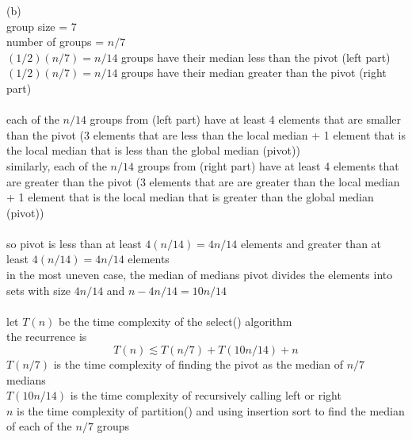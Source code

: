 \documentclass[12pt,border=4pt,multi]{article}%
\begin{document}
\\
\\
\\
\\
\\
(b)\\
group size = 7\\
number of groups = $n/7$\\
$(1/2)(n/7) = n/14$ groups have their median less than the pivot	(left part)\\
$(1/2)(n/7) = n/14$ groups have their median greater than the pivot	(right part)\\
\\
each of the $n/14$ groups from (left part)
have at least 4 elements that are smaller than the pivot
(3 elements that are less than the local median + 1 element that is the local median 
that is less than the global median (pivot))
\\
similarly,
each of the $n/14$ groups from (right part)
have at least 4 elements that are greater than the pivot
(3 elements that are are greater than the local median + 1 element that is the local median 
that is greater than the global median (pivot))\\
\\
so pivot is less than at least $4(n/14) = 4n/14$ elements 
and greater than at least $4(n/14) = 4n/14$ elements
\\
in the most uneven case, the median of medians pivot divides the elements into sets with size $4n/14$ and $n - 4n/14 = 10n/14$\\
\\
let $T(n)$ be the time complexity of the select() algorithm\\
the recurrence is 
\[\boxed{T(n) \lesssim T(n/7) + T(10n/14) + n}\]
$T(n/7)$ is the time complexity of finding the pivot as the median of $n/7$ medians\\
$T(10n/14)$ is the time complexity of recursively calling left or right\\
$n$ is the time complexity of partition() and using insertion sort to find the median of each of the $n/7$ groups\\
\end{document}
